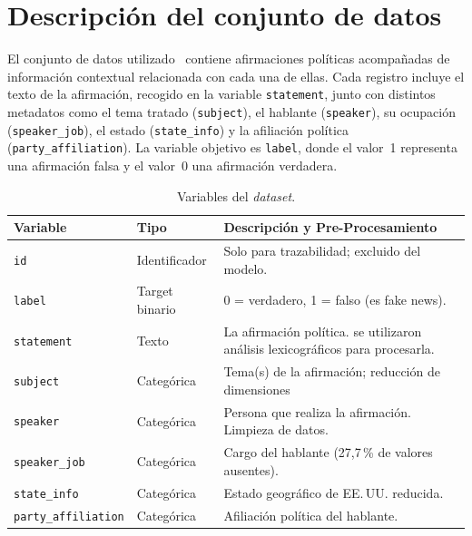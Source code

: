 \documentclass[12pt,a4paper]{article}
\begin{document}
\section{Descripción del conjunto de datos}

El conjunto de datos utilizado~\cite{liar} contiene afirmaciones políticas acompañadas de información contextual relacionada con cada una de ellas. Cada registro incluye el texto de la afirmación, recogido en la variable \texttt{statement}, junto con distintos metadatos como el tema tratado (\texttt{subject}), el hablante (\texttt{speaker}), su ocupación (\texttt{speaker\_job}), el estado (\texttt{state\_info}) y la afiliación política (\texttt{party\_affiliation}). La variable objetivo es \texttt{label}, donde el valor~1 representa una afirmación falsa y el valor~0 una afirmación verdadera.

\begin{table}[H]
  \centering
  \caption{Variables del \emph{dataset}.}
  \label{tab:columnas}
  \begin{tabularx}{\textwidth}{llX}
    \toprule
    \textbf{Variable}           & \textbf{Tipo}       & \textbf{Descripción y Pre-Procesamiento} \\
    \midrule
    \texttt{id}                 & Identificador       & Solo para trazabilidad; excluido del modelo. \\
    \texttt{label}              & Target binario      & 0 = verdadero, 1 = falso (es fake news).\\
    \texttt{statement}          & Texto               & La afirmación política. se utilizaron análisis lexicográficos para procesarla. \\
    \texttt{subject}            & Categórica          & Tema(s) de la afirmación; reducción de dimensiones  \\
    \texttt{speaker}            & Categórica          & Persona que realiza la afirmación. Limpieza de datos. \\
    \texttt{speaker\_job}       & Categórica          & Cargo del hablante (27,7\,\% de valores ausentes). \\
    \texttt{state\_info}        & Categórica          & Estado geográfico de EE.\,UU. reducida.\\
    \texttt{party\_affiliation} & Categórica          & Afiliación política del hablante. \\
    \bottomrule
  \end{tabularx}
\end{table}
\end{document}
